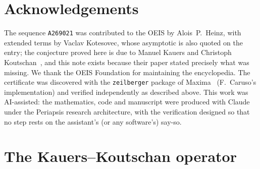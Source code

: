 \documentclass[11pt]{article}
\theoremstyle{plain}
\theoremstyle{definition}
\theoremstyle{remark}
\newcommand{\OEIS}[1]{\texttt{#1}}
\begin{document}
\section*{Acknowledgements}

The sequence \OEIS{A269021} was contributed to the OEIS by Alois~P.~Heinz, with extended terms
by Vaclav Kotesovec, whose asymptotic is also quoted on the entry; the conjecture proved here is
due to Manuel Kauers and Christoph Koutschan~\cite{KK23}, and this note exists because their
paper stated precisely what was missing. We thank the OEIS Foundation for maintaining the
encyclopedia. The certificate was discovered with the \texttt{zeilberger} package of
Maxima~\cite{Maxima} (F.~Caruso's implementation) and verified independently as described above.
This work was AI-assisted: the mathematics, code and manuscript were produced with Claude
under the Periapsis research architecture, with the
verification designed so that no step rests on the assistant's (or any software's) say-so.

\appendix

\section{The Kauers--Koutschan operator}\label{app:rec}
\end{document}
